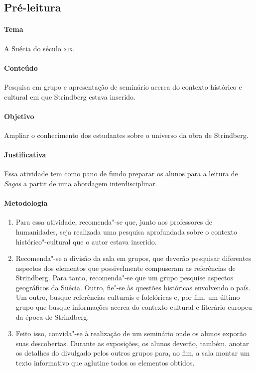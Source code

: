 \documentclass[12pt]{extarticle}
\begin{document}

\subsection{Pré-leitura}

\paragraph{Tema} A Suécia do século \textsc{xix}.

\paragraph{Conteúdo} Pesquisa em grupo e apresentação de seminário acerca do contexto histórico e cultural em que Strindberg estava inserido. 

\paragraph{Objetivo} Ampliar o conhecimento dos estudantes sobre o universo da obra de Strindberg.

\paragraph{Justificativa} Essa atividade tem como pano de fundo preparar os alunos para a leitura de \emph{Sagas}
a partir de uma abordagem interdisciplinar.

\paragraph{Metodologia}

\begin{enumerate}

\item Para essa atividade, recomenda"-se que, junto aos professores de humanidades, seja
realizada uma pesquisa aprofundada sobre o contexto histórico"-cultural
que o autor estava inserido.

\item Recomenda"-se a divisão da
sala em grupos, que deverão pesquisar diferentes aspectos dos elementos que
possivelmente compuseram as referências de Strindberg. Para tanto,
recomenda"-se que um grupo pesquise aspectos geográficos da Suécia.
Outro, fie"-se às questões históricas envolvendo o país. Um outro, busque
referências culturais e folclóricas e, por fim, um último grupo que busque
informações acerca do contexto cultural e literário europeu da época de
Strindberg.

\item Feito isso, convida"-se à realização de um seminário onde os
alunos exporão suas descobertas. Durante as exposições, os alunos
deverão, também, anotar os detalhes do divulgado pelos outros grupos
para, ao fim, a sala montar um texto informativo que aglutine todos os
elementos obtidos.

\end{enumerate}
\end{document}
